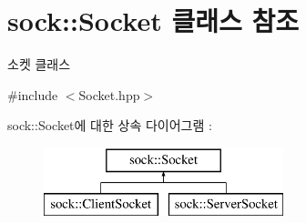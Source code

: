 \hypertarget{classsock_1_1_socket}{}\section{sock\+:\+:Socket 클래스 참조}
\label{classsock_1_1_socket}


소켓 클래스  




{\ttfamily \#include $<$Socket.\+hpp$>$}

sock\+:\+:Socket에 대한 상속 다이어그램 \+: \begin{figure}[H]
\begin{center}
\leavevmode
\includegraphics[height=2.000000cm]{classsock_1_1_socket}
\end{center}
\end{figure}
